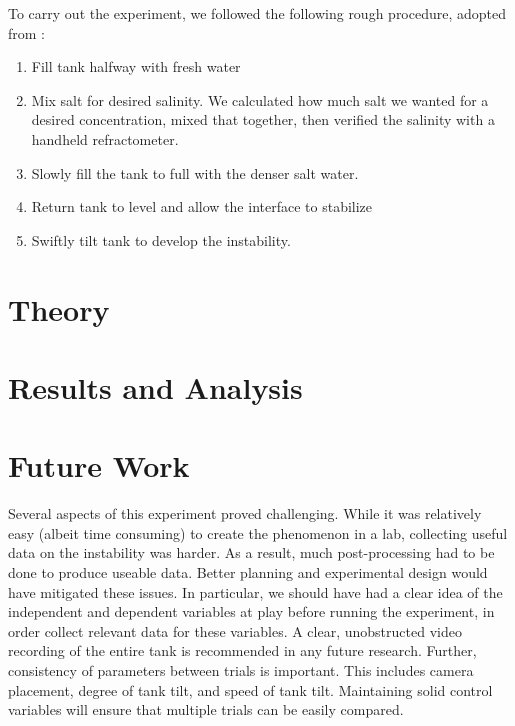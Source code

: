 \documentclass{article}
\begin{document}
To carry out the experiment, we followed the following rough procedure, adopted
from \cite{kh-instability-demo}:

\begin{enumerate}
    \item Fill tank halfway with fresh water
    \item Mix salt for desired salinity. We calculated how much salt we wanted
    for a desired concentration, mixed that together, then verified the salinity
    with a handheld refractometer.
    \item Slowly fill the tank to full with the denser salt water.
    \item Return tank to level and allow the interface to stabilize
    \item Swiftly tilt tank to develop the instability.
\end{enumerate}

\section{Theory}

\cite{kundu}

\section{Results and Analysis}

\section{Future Work}

Several aspects of this experiment proved challenging. While it was relatively
easy (albeit time consuming) to create the phenomenon in a lab, collecting
useful data on the instability was harder. As a result, much post-processing had
to be done to produce useable data. Better planning and experimental design
would have mitigated these issues. In particular, we should have had a clear
idea of the independent and dependent variables at play before running the
experiment, in order collect relevant data for these variables. A clear,
unobstructed video recording of the entire tank is recommended in any future
research. Further, consistency of parameters between trials is important. This
includes camera placement, degree of tank tilt, and speed of tank tilt.
Maintaining solid control variables will ensure that multiple trials can be
easily compared.

\newpage
{}

\end{document}
